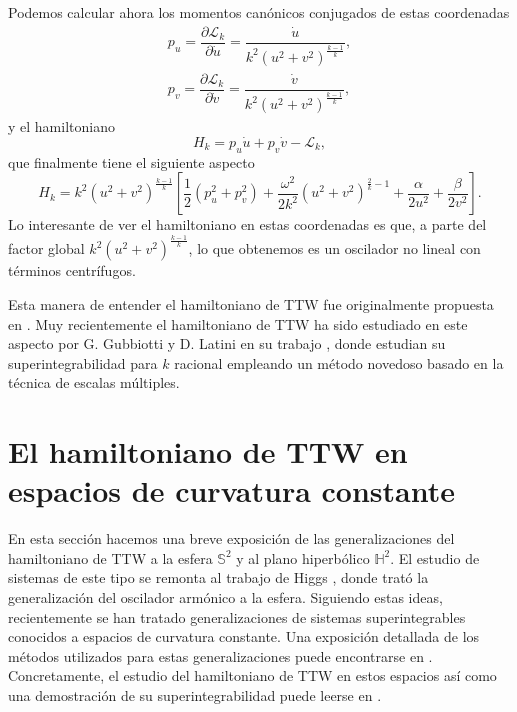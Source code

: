 \documentclass[11pt,a4paper,twoside]{article}
\theoremstyle{definition} \newtheorem{defn}[thm]{Definición}
\theoremstyle{definition} \newtheorem{ejemplo}[thm]{Ejemplo}
\theoremstyle{definition} \newtheorem{ejercicio}[thm]{Ejercicio}
\theoremstyle{remark} \newtheorem*{obs}{Observación}
\begin{document}
Podemos calcular ahora los momentos canónicos conjugados de estas coordenadas
\begin{align}
    p_u=\dfrac{\partial \mathcal{L} _k}{\partial \dot{u}}=\dfrac{\dot{u}}{k^2 (u^2+v^2)^{\frac{k-1}{k}}}, \\
    p_v=\dfrac{\partial \mathcal{L} _k}{\partial \dot{v}}=\dfrac{\dot{v}}{k^2 (u^2+v^2)^{\frac{k-1}{k}}},
\end{align}
y el hamiltoniano
\begin{equation*}
  H_k=p_u \dot{u} + p_v \dot{v} - \mathcal{L}_k,
\end{equation*}
que finalmente tiene el siguiente aspecto
\begin{equation}\label{nuevottw}
  H_k = k^2 (u^2+v^2)^{\frac{k-1}{k}}\left[ \frac{1}{2}(p_u^2+p_v^2)+ \frac{\omega^2}{2k^2}(u^2+v^2)^{\frac{2}{k}-1}+\frac{\alpha}{2u^2}+\frac{\beta}{2 v^2} \right]. 
\end{equation}
Lo interesante de ver el hamiltoniano en estas coordenadas es que, a parte del factor global $k^2(u^2+v^2)^{\frac{k-1}{k}}$, lo que obtenemos es un oscilador no lineal con términos centrífugos.

Esta manera de entender el hamiltoniano de TTW fue originalmente propuesta en \cite{burgos}. Muy recientemente el hamiltoniano de TTW ha sido estudiado en este aspecto por G. Gubbiotti y D. Latini en su trabajo \cite{gubbiottilatini}, donde estudian su superintegrabilidad para $k$ racional empleando un método novedoso basado en la técnica de escalas múltiples.

\section{El hamiltoniano de TTW en espacios de curvatura constante}\label{curvo}
En esta sección hacemos una breve exposición de las generalizaciones del hamiltoniano de TTW a la esfera $\mathbb{S} ^2$ y al plano hiperbólico $\mathbb{H} ^2.$ El estudio de sistemas de este tipo se remonta al trabajo de Higgs \cite{higgs}, donde trató la generalización del oscilador armónico a la esfera. Siguiendo estas ideas, recientemente se han tratado generalizaciones de sistemas superintegrables conocidos a espacios de curvatura constante. Una exposición detallada de los métodos utilizados para estas generalizaciones puede encontrarse en \cite{ballesteros}. Concretamente, el estudio del hamiltoniano de TTW en estos espacios así como una demostración de su superintegrabilidad puede leerse en \cite{ranada}.
\end{document}
